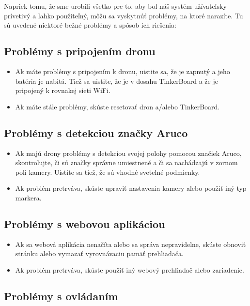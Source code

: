 \documentclass[a4paper]{feidippp}
\begin{document}
Napriek tomu, že sme urobili všetko pre to, aby bol náš systém užívateľsky prívetivý a ľahko použiteľný, môžu sa vyskytnúť problémy, na ktoré narazíte. Tu sú uvedené niektoré bežné problémy a spôsob ich riešenia:

\subsection{Problémy s pripojením dronu}

\begin{itemize}
\item Ak máte problémy s pripojením k dronu, uistite sa, že je zapnutý a jeho batéria je nabitá. Tiež sa uistite, že je v dosahu TinkerBoard a že je pripojený k rovnakej sieti WiFi.
\item Ak máte stále problémy, skúste resetovať dron a/alebo TinkerBoard.
\end{itemize}

\subsection{Problémy s detekciou značky Aruco}
  
\begin{itemize}
\item Ak majú drony problémy s detekciou svojej polohy pomocou značiek Aruco, skontrolujte, či sú značky správne umiestnené a či sa nachádzajú v zornom poli kamery. Uistite sa tiež, že sú vhodné svetelné podmienky.
\item Ak problém pretrváva, skúste upraviť nastavenia kamery alebo použiť iný typ markera.
\end{itemize}
 
\subsection{Problémy s webovou aplikáciou}

\begin{itemize}
\item Ak sa webová aplikácia nenačíta alebo sa správa nepravidelne, skúste obnoviť stránku alebo vymazať vyrovnávaciu pamäť prehliadača.
\item Ak problém pretrváva, skúste použiť iný webový prehliadač alebo zariadenie.
\end{itemize}

\subsection{Problémy s ovládaním}
\end{document}
